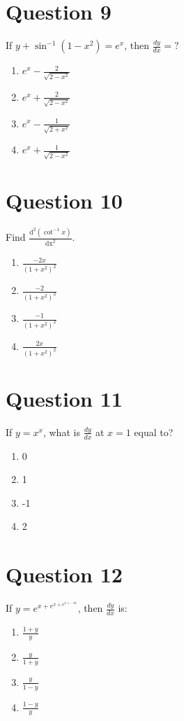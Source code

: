 \documentclass{article}
\begin{document}
\section*{Question 9}
If \(y+\sin ^{-1}\left(1-x^{2}\right)=e^{x}\), then \(\frac{d y}{d x}=?\) 
\begin{enumerate}[label=(\alph*)]
\item \(e^{x}-\frac{2}{\sqrt{2-x^{2}}}\)
\item \(e^{x}+\frac{2}{\sqrt{2-x^{2}}}\)
\item \(e^{x}-\frac{1}{\sqrt{2+x^{2}}}\)
\item \(e^{x}+\frac{1}{\sqrt{2-x^{2}}}\)
\end{enumerate}
\newpage
\section*{Question 10}
Find \(\frac{\mathrm{d}^{2} (\cot ^{-1} x)}{\mathrm{dx}^{2}}\).
\begin{enumerate}[label=(\alph*)]
\item \(\frac{-2 x}{\left(1+x^{2}\right)^{2}}\)
\item \(\frac{-2}{\left(1+x^{2}\right)^{2}}\)
\item \(\frac{-1}{\left(1+x^{2}\right)^{2}}\)
\item \(\frac{2 x}{\left(1+x^{2}\right)^{2}}\)
\end{enumerate}
\newpage
\section*{Question 11}
If \(y=x^{x}\), what is \(\frac{d y}{d x}\) at \(x=1\) equal to?
\begin{enumerate}[label=(\alph*)]
\item 0
\item 1
\item -1
\item 2
\end{enumerate}
\newpage
\section*{Question 12}
If \(y=e^{x+e^{x+e^{x+\cdots \infty}}}\), then \(\frac{d y}{d x}\) is:
\begin{enumerate}[label=(\alph*)]
\item \(\frac{1+{y}}{{y}}\)
\item \(\frac{y}{1+y}\)
\item \(\frac{{y}}{1-{y}}\)
\item \(\frac{1-y}{y}\)
\end{enumerate}
\newpage
\end{document}
